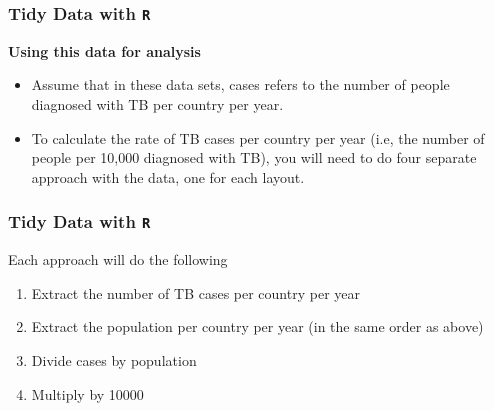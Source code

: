 \documentclass[TIDYMASTER.tex]{subfiles}
\begin{document}
\begin{frame}[fragile]
	\frametitle{Tidy Data with \texttt{R}}
	\Large
\noindent \textbf{Using this data for analysis}
\begin{itemize}
\item Assume that in these data sets, cases refers to the number of people diagnosed with TB per country per year. 
\item To calculate the rate of TB cases per country per year (i.e, the number of people per 10,000 diagnosed with TB), you will need to do four separate approach with the data, one for each layout.
\end{itemize}


\end{frame}

\begin{frame}[fragile]
	\frametitle{Tidy Data with \texttt{R}}
	\Large
Each approach will do the following
\begin{enumerate}	
\item	Extract the number of TB cases per country per year
\item	Extract the population per country per year (in the same order as above)
\item	Divide cases by population
\item 	Multiply by 10000
\end{enumerate}
\end{frame}
\end{document}
